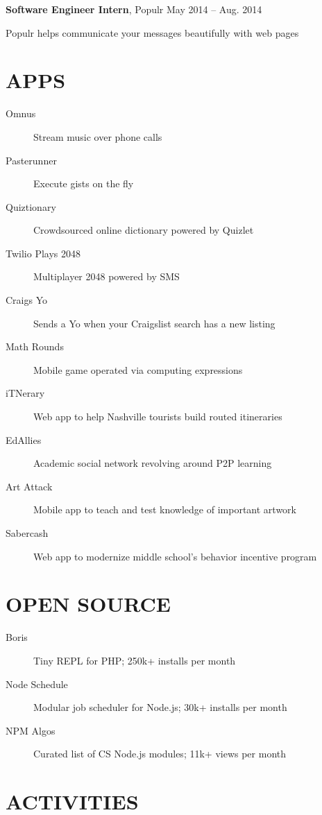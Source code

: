 \documentclass{res}
\begin{document}
{\bf Software Engineer Intern}, Populr \hfill May 2014 -- Aug. 2014
\begin{description}
  \item Populr helps communicate your messages beautifully with web pages
\end{description}

\section{APPS}

\begin{description}
  \item[Omnus] Stream music over phone calls
  \item[Pasterunner] Execute gists on the fly
  \item[Quiztionary] Crowdsourced online dictionary powered by Quizlet
  \item[Twilio Plays 2048] Multiplayer 2048 powered by SMS
  \item[Craigs Yo] Sends a Yo when your Craigslist search has a new listing
  \item[Math Rounds] Mobile game operated via computing expressions
  \item[iTNerary] Web app to help Nashville tourists build routed itineraries
  \item[EdAllies] Academic social network revolving around P2P learning
  \item[Art Attack] Mobile app to teach and test knowledge of important artwork
  \item[Sabercash] Web app to modernize middle school's behavior incentive program
\end{description}

\section{OPEN SOURCE}

\begin{description}
  \item[Boris] Tiny REPL for PHP; 250k+ installs per month
  \item[Node Schedule] Modular job scheduler for Node.js; 30k+ installs per month
  \item[NPM Algos] Curated list of CS Node.js modules; 11k+ views per month
\end{description}

\section{ACTIVITIES}
\end{document}
